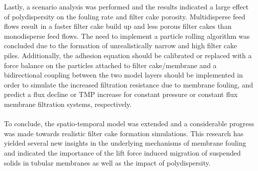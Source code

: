  Lastly, a scenario analysis was performed and the results indicated a large effect of polydispersity on the fouling rate and filter cake porosity.  Multidisperse feed flows result in a faster filter cake build up and less porous filter cakes than monodisperse feed flows. The need to implement a particle rolling algorithm was concluded due to the formation of unrealistically narrow and high filter cake piles. Additionally, the adhesion equation should be calibrated or replaced with a force balance on the particles attached to filter cake/membrane and a bidirectional coupling between the two model layers should be implemented in order to simulate the increased filtration resistance due to membrane fouling, and predict a flux decline or \gls{TMP} increase for constant pressure or constant flux membrane filtration systems, respectively. \\ \\
 To conclude, the spatio-temporal model was extended and a considerable progress was made towards realistic filter cake formation simulations. This research has yielded several new insights in the underlying mechanisms of membrane fouling and indicated the importance of the lift force induced migration of suspended solids in tubular membranes as well as the impact of polydispersity.

 

